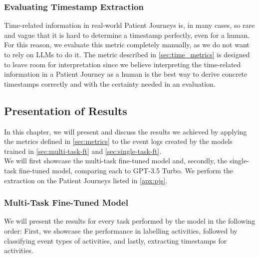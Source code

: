 \subsubsection{Evaluating Timestamp Extraction}\label{sec:eval_time}
Time-related information in real-world Patient Journeys is, in many cases, so rare and vague that it is hard to determine a timestamp perfectly, even for a human. For this reason, we evaluate this metric completely manually, as we do not want to rely on LLMs to do it. The metric described in \autoref{sec:time_metrics} is designed to leave room for interpretation since we believe interpreting the time-related information in a Patient Journey as a human is the best way to derive concrete timestamps correctly and with the certainty needed in an evaluation.

\subsection{Presentation of Results}\label{sec:results}
In this chapter, we will present and discuss the results we achieved by applying the metrics defined in \autoref{sec:metrics} to the event logs created by the models trained in \autoref{sec:multi-task-ft} and \autoref{sec:single-task-ft}.\\
We will first showcase the multi-task fine-tuned model and, secondly, the single-task fine-tuned model, comparing each to GPT-3.5 Turbo. We perform the extraction on the Patient Journeys listed in \ref{apx:pjs}.

\subsubsection{Multi-Task Fine-Tuned Model}\label{sec_eval_multi}
We will present the results for every task performed by the model in the following order: First, we showcase the performance in labelling activities, followed by classifying event types of activities, and lastly, extracting timestamps for activities.

